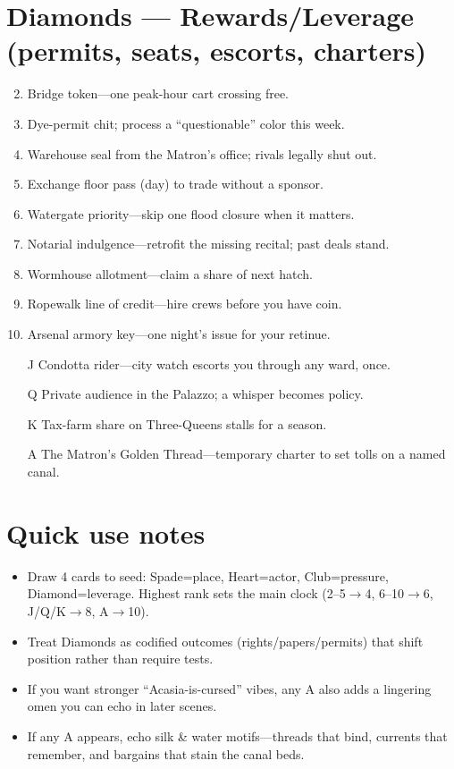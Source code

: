 \section*{Diamonds --- Rewards/Leverage (permits, seats, escorts, charters)}
\label{sec:silkstrand-rewards}
\begin{enumerate}
\setcounter{enumi}{1}
\item Bridge token---one peak-hour cart crossing free.
\item Dye-permit chit; process a ``questionable'' color this week.
\item Warehouse seal from the Matron's office; rivals legally shut out.
\item Exchange floor pass (day) to trade without a sponsor.
\item Watergate priority---skip one flood closure when it matters.
\item Notarial indulgence---retrofit the missing recital; past deals stand.
\item Wormhouse allotment---claim a share of next hatch.
\item Ropewalk line of credit---hire crews before you have coin.
\item Arsenal armory key---one night's issue for your retinue.
\item[J] Condotta rider---city watch escorts you through any ward, once.
\item[Q] Private audience in the Palazzo; a whisper becomes policy.
\item[K] Tax-farm share on Three-Queens stalls for a season.
\item[A] The Matron's Golden Thread---temporary charter to set tolls on a named canal.
\end{enumerate}

\section*{Quick use notes}
\label{sec:silkstrand-quick-use}
\begin{itemize}
\item Draw 4 cards to seed: Spade=place, Heart=actor, Club=pressure, Diamond=leverage. Highest rank sets the main clock (2--5$\rightarrow$4, 6--10$\rightarrow$6, J/Q/K$\rightarrow$8, A$\rightarrow$10).
\item Treat Diamonds as codified outcomes (rights/papers/permits) that shift position rather than require tests.
\item If you want stronger ``Acasia-is-cursed'' vibes, any A also adds a lingering omen you can echo in later scenes.
\item If any A appears, echo silk \& water motifs---threads that bind, currents that remember, and bargains that stain the canal beds.
\end{itemize}

